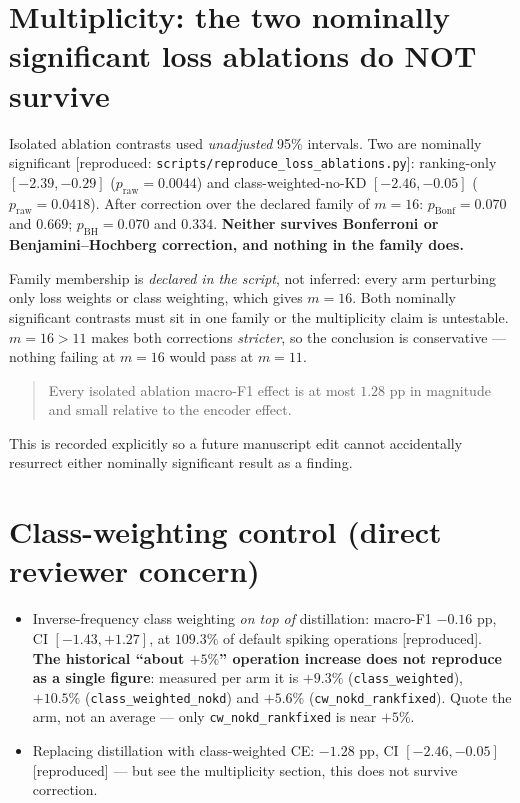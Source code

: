 \section*{Multiplicity: the two nominally significant loss ablations do NOT survive}

Isolated ablation contrasts used \emph{unadjusted} 95\% intervals. Two are nominally
significant \textup{[reproduced: \texttt{scripts/reproduce\_loss\_ablations.py}]}:
ranking-only $[-2.39, -0.29]$ ($p_{\mathrm{raw}}=0.0044$) and class-weighted-no-KD
$[-2.46, -0.05]$ ($p_{\mathrm{raw}}=0.0418$). After correction over the declared family
of $m=16$: $p_{\mathrm{Bonf}}=0.070$ and $0.669$; $p_{\mathrm{BH}}=0.070$ and
$0.334$. \textbf{Neither survives Bonferroni or Benjamini--Hochberg correction, and
nothing in the family does.}

\noindent Family membership is \emph{declared in the script}, not inferred: every arm
perturbing only loss weights or class weighting, which gives $m=16$. Both nominally
significant contrasts must sit in one family or the multiplicity claim is untestable.
$m=16>11$ makes both corrections \emph{stricter}, so the conclusion is conservative ---
nothing failing at $m=16$ would pass at $m=11$.

\begin{quote}
Every isolated ablation macro-F1 effect is at most $1.28$ pp in
magnitude and small relative to the encoder effect.
\end{quote}

\noindent This is recorded explicitly so a future manuscript edit cannot accidentally
resurrect either nominally significant result as a finding.

\section*{Class-weighting control (direct reviewer concern)}

\begin{itemize}
  \item Inverse-frequency class weighting \emph{on top of} distillation: macro-F1
        $\mathbf{-0.16}$ pp, CI $[-1.43, +1.27]$, at $109.3\%$ of default spiking
        operations \textup{[reproduced]}. \textbf{The historical ``about $+5\%$''
        operation increase does not reproduce as a single figure}: measured per arm it is
        $+9.3\%$ (\texttt{class\_weighted}), $+10.5\%$ (\texttt{class\_weighted\_nokd})
        and $+5.6\%$ (\texttt{cw\_nokd\_rankfixed}). Quote the arm, not an average ---
        only \texttt{cw\_nokd\_rankfixed} is near $+5\%$.
  \item Replacing distillation with class-weighted CE: $\mathbf{-1.28}$ pp,
        CI $[-2.46, -0.05]$ \textup{[reproduced]} --- but see the
        multiplicity section, this does not survive correction.
\end{itemize}


